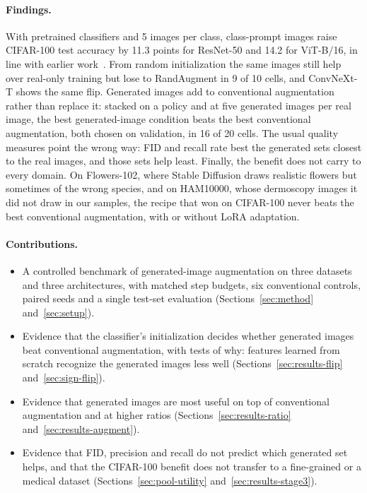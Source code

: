 \paragraph{Findings.}
With pretrained classifiers and 5 images per class, class-prompt images raise CIFAR-100 test accuracy by 11.3
points for ResNet-50 and 14.2 for ViT-B/16, in line with earlier work~\cite{he2023synthetic}. From random
initialization the same images still help over real-only training but lose to RandAugment in 9 of 10 cells, and
ConvNeXt-T shows the same flip. Generated images add to conventional augmentation rather than replace it:
stacked on a policy and at five generated images per real image, the best generated-image condition beats the
best conventional augmentation, both chosen on validation, in 16 of 20 cells. The usual quality measures point
the wrong way: FID and recall rate best the generated sets closest to the real images, and those sets help
least. Finally, the benefit does not carry to every domain. On Flowers-102, where Stable Diffusion draws
realistic flowers but sometimes of the wrong species, and on HAM10000, whose dermoscopy images it did not draw
in our samples, the recipe that won on CIFAR-100 never beats the best conventional augmentation, with or without LoRA
adaptation.

\paragraph{Contributions.}
\begin{itemize}
	\item A controlled benchmark of generated-image augmentation on three datasets and three architectures, with
	matched step budgets, six conventional controls, paired seeds and a single test-set evaluation
	(Sections~\ref{sec:method} and~\ref{sec:setup}).
	\item Evidence that the classifier's initialization decides whether generated images beat conventional
	augmentation, with tests of why: features learned from scratch recognize the generated images less well
	(Sections~\ref{sec:results-flip} and~\ref{sec:sign-flip}).
	\item Evidence that generated images are most useful on top of conventional augmentation and at higher ratios
	(Sections~\ref{sec:results-ratio} and~\ref{sec:results-augment}).
	\item Evidence that FID, precision and recall do not predict which generated set helps, and that the CIFAR-100
	benefit does not transfer to a fine-grained or a medical dataset (Sections~\ref{sec:pool-utility}
	and~\ref{sec:results-stage3}).
\end{itemize}
